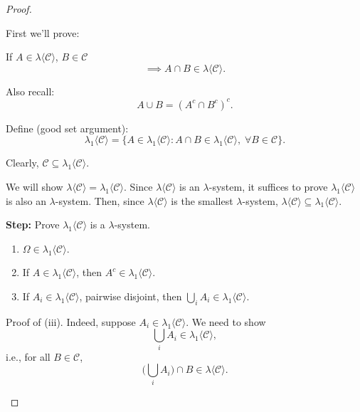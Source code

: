 \documentclass[11pt]{article}
\theoremstyle{definition}
\begin{document}
\begin{proof}
\begin{enumerate}
        \bigskip
        
        First we'll prove: 
        
        If $A \in \lambda\langle \mathcal{C}\rangle$, $B \in \mathcal{C}$  
        \[
        \implies A \cap B \in \lambda\langle \mathcal{C}\rangle.
        \]
        
        \bigskip
        
        Also recall: 
        \[
        A \cup B = (A^c \cap B^c)^c.
        \]


        Define (good set argument):
        \[
        \lambda_1\langle \mathcal{C}\rangle = \{ A \in \lambda_1\langle \mathcal{C}\rangle : A \cap B \in \lambda_1\langle \mathcal{C}\rangle, \; \forall B \in \mathcal{C}\}.
        \]
        
        Clearly, $\mathcal{C} \subseteq \lambda_1\langle \mathcal{C}\rangle$.
        
        \medskip
        
        We will show $\lambda\langle \mathcal{C}\rangle = \lambda_1\langle \mathcal{C}\rangle$. Since $\lambda\langle \mathcal{C}\rangle$ is an $\lambda$-system, it suffices to prove $\lambda_1\langle \mathcal{C}\rangle$ is also an $\lambda$-system. Then, since $\lambda\langle \mathcal{C}\rangle$ is the smallest $\lambda$-system, $\lambda\langle \mathcal{C}\rangle \subseteq \lambda_1\langle \mathcal{C}\rangle$.
        
        \bigskip
        
        \textbf{Step:} Prove $\lambda_1\langle \mathcal{C}\rangle$ is a $\lambda$-system.
        
        \begin{enumerate}
            \item[(i)] $\Omega \in \lambda_1\langle \mathcal{C}\rangle$.
            \item[(ii)] If $A \in \lambda_1\langle \mathcal{C}\rangle$, then $A^c \in \lambda_1\langle \mathcal{C}\rangle$.
            \item[(iii)] If $A_i \in \lambda_1\langle \mathcal{C}\rangle$, pairwise disjoint, then $\bigcup_i A_i \in \lambda_1\langle \mathcal{C}\rangle$.
        \end{enumerate}
        
        \medskip
        
        Proof of (iii). Indeed, suppose $A_i \in \lambda_1\langle \mathcal{C}\rangle$.  
        We need to show
        \[
        \bigcup_i A_i \in \lambda_1\langle \mathcal{C}\rangle,
        \]
        i.e., for all $B \in \mathcal{C}$,
        \[
        \Big(\bigcup_i A_i\Big) \cap B \in \lambda\langle \mathcal{C}\rangle.
        \]
        

\end{enumerate}
\end{proof}
\end{document}
